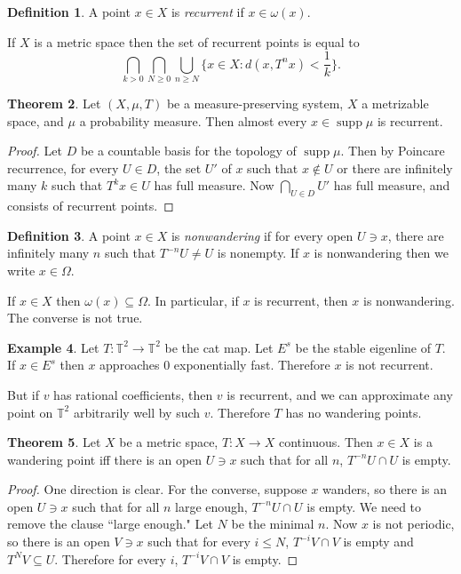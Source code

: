 \documentclass[12pt]{report}
\newcommand{\TT}{\mathbb{T}}
\newcommand{\supp}{\operatorname{supp}}
\newcommand{\dfn}[1]{\emph{#1}\index{#1}}
\theoremstyle{definition}
\newtheorem{theorem}{Theorem}[chapter]
\newtheorem{definition}[theorem]{Definition}
\newtheorem{example}[theorem]{Example}
\begin{document}
\begin{definition}
A point $x \in X$ is \dfn{recurrent} if $x \in \omega(x)$.
\end{definition}
If $X$ is a metric space then the set of recurrent points is equal to
$$\bigcap_{k > 0} \bigcap_{N \geq 0} \bigcup_{n \geq N} \{x \in X: d(x, T^nx) < \frac{1}{k}\}.$$
\begin{theorem}
Let $(X, \mu, T)$ be a measure-preserving system, $X$ a metrizable space, and $\mu$ a probability measure. Then almost every $x \in \supp \mu$ is recurrent.
\end{theorem}
\begin{proof}
Let $D$ be a countable basis for the topology of $\supp \mu$. Then by Poincare recurrence, for every $U \in D$, the set $U'$ of $x$ such that $x \notin U$ or there are infinitely many $k$ such that $T^kx \in U$ has full measure.
Now $\bigcap_{U \in D} U'$ has full measure, and consists of recurrent points.
\end{proof}

\begin{definition}
A point $x \in X$ is \dfn{nonwandering} if for every open $U \ni x$, there are infinitely many $n$ such that $T^{-n}U \neq U$ is nonempty. If $x$ is nonwandering then we write $x \in \Omega$.
\end{definition}
If $x \in X$ then $\omega(x) \subseteq \Omega$. In particular, if $x$ is recurrent, then $x$ is nonwandering. The converse is not true.

\begin{example}
Let $T: \TT^2 \to \TT^2$ be the cat map. Let $E^s$ be the stable eigenline of $T$. If $x \in E^s$ then $x$ approaches $0$ exponentially fast. Therefore $x$ is not recurrent.

But if $v$ has rational coefficients, then $v$ is recurrent, and we can approximate any point on $\TT^2$ arbitrarily well by such $v$. Therefore $T$ has no wandering points.
\end{example}

\begin{theorem}
Let $X$ be a metric space, $T: X \to X$ continuous. Then $x \in X$ is a wandering point iff there is an open $U \ni x$ such that for all $n$, $T^{-n}U \cap U$ is empty.
\end{theorem}
\begin{proof}
One direction is clear. For the converse, suppose $x$ wanders, so there is an open $U \ni x$ such that for all $n$ large enough, $T^{-n}U \cap U$ is empty. We need to remove the clause ``large enough." Let $N$ be the minimal $n$.
Now $x$ is not periodic, so there is an open $V \ni x$ such that for every $i \leq N$, $T^{-i}V \cap V$ is empty and $T^NV \subseteq U$. Therefore for every $i$, $T^{-i}V \cap V$ is empty.
\end{proof}
\end{document}
